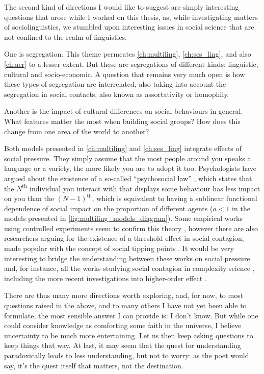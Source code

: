 \documentclass[../thesis.tex]{subfiles}
\begin{document}
The second kind of directions I would like to suggest are simply interesting questions
that arose while I worked on this thesis, as, while investigating matters of
sociolinguistics, we stumbled upon interesting issues in social science that are not
confined to the realm of linguistics.

One is segregation. This theme permeates \cref{ch:multiling},
\cref{ch:ses_ling}, and also \cref{ch:acr} to a lesser extent. But these are
segregations of different kinds: linguistic, cultural and socio-economic. A question
that remains very much open is how these types of segregation are interrelated, also
taking into account the segregation in social contacts, also known as assortativity or
homophily.

Another is the impact of cultural differences on social behaviours in general. What
features matter the most when building social groups? How does this change from one area
of the world to another?

Both models presented in \cref{ch:multiling} and \cref{ch:ses_ling} integrate effects of
social pressure. They simply assume that the most people around you speaks a language or
a variety, the more likely you are to adopt it too. Psychologists have argued about the
existence of a so-called ``psychosocial law'' \cite{LatanePsychologySocial1981}, which
states that the $N^\text{th}$ individual you interact with that displays some behaviour
has less impact on you than the $(N - 1)^\text{th}$, which is equivalent to having a
sublinear functional dependence of social impact on the proportion of different agents
($a < 1$ in the models presented in \cref{fig:multiling_models_diagram}). Some empirical
works using controlled experiments seem to confirm this theory
\cite{GerardConformityGroup1968,MilgramNoteDrawing1969}, however there are also
researchers arguing for the existence of a threshold effect in social contagion, made
popular with the concept of social tipping points \cite{MilkoreitDefiningTipping2018}.
It would be very interesting to bridge the understanding between these works on social
pressure and, for instance, all the works studying social contagion in complexity
science \cite{WattsInfluentialsNetworks2007}, including the more recent investigations
into higher-order effect \cite{IacopiniSimplicialModels2019}.

There are thus many more directions worth exploring, and, for now, to most questions
raised in the above, and to many others I have not yet been able to formulate, the most
sensible answer I can provide is: I don't know. But while one could consider knowledge
as comforting some faith in the universe, I believe uncertainty to be much more
entertaining. Let us then keep asking questions to keep things that way.
At last, it may seem that the quest for understanding paradoxically leads to less
understanding, but not to worry:
as the poet would say,
it's the quest itself that matters, not the destination.
\end{document}
